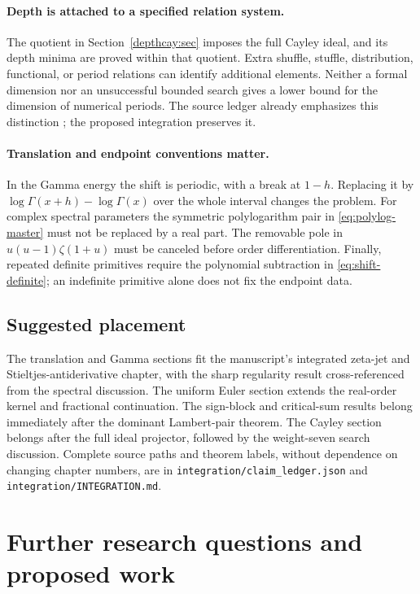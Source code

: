 \paragraph{Depth is attached to a specified relation system.}
The quotient in Section~\ref{depthcay:sec} imposes the full Cayley ideal,
and its depth minima are proved within that quotient. Extra shuffle,
stuffle, distribution, functional, or period relations can identify
additional elements. Neither a formal dimension nor an unsuccessful
bounded search gives a lower bound for the dimension of numerical
periods. The source ledger already emphasizes this distinction
\cite{RepoManuscript}; the proposed integration preserves it.

\paragraph{Translation and endpoint conventions matter.}
In the Gamma energy the shift is periodic, with a break at $1-h$.
Replacing it by $\log\Gamma(x+h)-\log\Gamma(x)$ over the whole interval
changes the problem. For complex spectral parameters the symmetric
polylogarithm pair in \eqref{eq:polylog-master} must not be replaced
by a real part. The removable pole in
$u(u-1)\zeta(1+u)$ must be canceled before order differentiation.
Finally, repeated definite primitives require the polynomial subtraction
in \eqref{eq:shift-definite}; an indefinite primitive alone does not fix
the endpoint data.

\subsection{Suggested placement}

The translation and Gamma sections fit the manuscript's integrated
zeta-jet and Stieltjes-antiderivative chapter, with the sharp regularity
result cross-referenced from the spectral discussion. The uniform Euler
section extends the real-order kernel and fractional continuation.
The sign-block and critical-sum results belong immediately after the
dominant Lambert-pair theorem. The Cayley section belongs after the full
ideal projector, followed by the weight-seven search discussion.
Complete source paths and theorem labels, without dependence on changing
chapter numbers, are in \texttt{integration/claim\_ledger.json} and
\texttt{integration/INTEGRATION.md}.

\section{Further research questions and proposed work}
\label{sec:questions}

